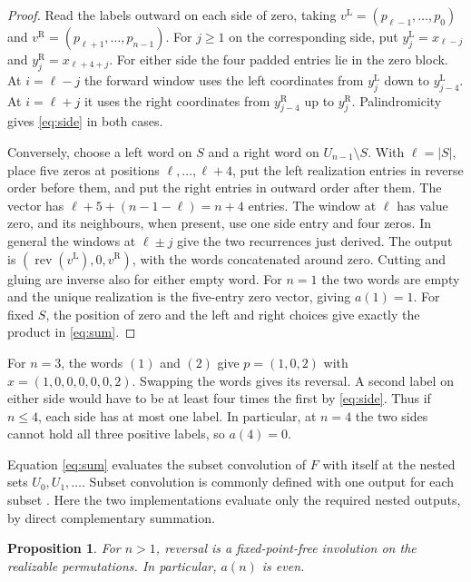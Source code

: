 \documentclass[11pt]{article}
\newtheorem{proposition}[theorem]{Proposition}
\newcommand{\rev}{\operatorname{rev}}
\begin{document}
\begin{proof}
Read the labels outward on each side of zero, taking
\(v^{\mathrm L}=(p_{\ell-1},\ldots,p_0)\) and
\(v^{\mathrm R}=(p_{\ell+1},\ldots,p_{n-1})\).
For \(j\geq1\) on the corresponding side, put
\(y^{\mathrm L}_j=x_{\ell-j}\) and
\(y^{\mathrm R}_j=x_{\ell+4+j}\).
For either side the four padded entries lie in the zero block.
At \(i=\ell-j\) the forward window uses the left coordinates from
\(y^{\mathrm L}_j\) down to \(y^{\mathrm L}_{j-4}\). At \(i=\ell+j\)
it uses the right coordinates from \(y^{\mathrm R}_{j-4}\) up to
\(y^{\mathrm R}_j\). Palindromicity gives \eqref{eq:side} in both cases.

Conversely, choose a left word on \(S\) and a right word on
\(U_{n-1}\setminus S\). With \(\ell=|S|\), place five zeros at positions
\(\ell,\ldots,\ell+4\), put the left realization entries in reverse
order before them, and put the right entries in outward order after them.
The vector has \(\ell+5+(n-1-\ell)=n+4\) entries. The window at
\(\ell\) has value zero, and its neighbours, when present, use one
side entry and four zeros. In general the windows at \(\ell\pm j\)
give the two recurrences just derived. The output is
\((\rev(v^{\mathrm L}),0,v^{\mathrm R})\), with the words concatenated
around zero. Cutting and gluing are inverse also for either empty word.
For \(n=1\) the two words are empty and the unique realization is the
five-entry zero vector, giving \(a(1)=1\). For fixed \(S\), the position
of zero and the left and right choices give exactly the product in
\eqref{eq:sum}.
\end{proof}

For \(n=3\), the words \((1)\) and \((2)\) give
\(p=(1,0,2)\) with \(x=(1,0,0,0,0,0,2)\). Swapping the words gives
its reversal. A second label on either side would have to be at least
four times the first by \eqref{eq:side}. Thus if \(n\le4\), each side
has at most one label. In particular, at \(n=4\) the two sides cannot
hold all three positive labels, so \(a(4)=0\).

Equation \eqref{eq:sum} evaluates the subset convolution of \(F\) with
itself at the nested sets \(U_0,U_1,\ldots\).
Subset convolution is commonly defined with one output for each subset
\cite[Eq.~(1)]{subsetconv}. Here the two implementations evaluate only the
required nested outputs, by direct complementary summation.

\begin{proposition}\label{prop:reversal}
For \(n>1\), reversal is a fixed-point-free involution on the realizable
permutations. In particular, \(a(n)\) is even.
\end{proposition}
\end{document}
